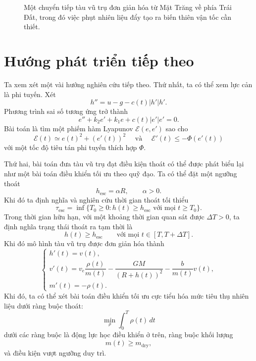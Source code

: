 ﻿\documentclass[12pt]{article}
\begin{document}
\begin{figure}[h]
\caption{Một chuyển tiếp tàu vũ trụ đơn giản hóa từ Mặt Trăng về phía Trái Đất, trong đó việc phụt nhiên liệu đẩy tạo ra biến thiên vận tốc cần thiết.}
\label{fig:moon-earth-transfer}
\end{figure} 

\section{Hướng phát triển tiếp theo}
Ta xem xét một vài hướng nghiên cứu tiếp theo.
Thứ nhất, ta có thể xem lực cản là phi tuyến. Xét
\[
 h'' = u - g - c(t)|h'|h'.
\]
Phương trình sai số tương ứng trở thành
\[
 e'' + k_2e' + k_1e + c(t)|e'|e' = 0.
\]
Bài toán là tìm một phiếm hàm Lyapunov $\mathcal E(e, e')$ sao cho
\[
 \mathcal E(t)\simeq e(t)^2 + (e'(t))^2 \quad \text{ và }\quad
 \mathcal E'(t) \leq - \Phi(e'(t))
\]
với một tốc độ tiêu tán phi tuyến thích hợp $\Phi$.

Thứ hai, bài toán đưa tàu vũ trụ đạt điều kiện thoát có thể được phát biểu lại như một bài toán điều khiển tối ưu theo quỹ đạo. Ta có thể đặt một ngưỡng thoát
\[
 h_{\mathrm{esc}} = \alpha R,\qquad \alpha > 0.
\]
Khi đó ta định nghĩa và nghiên cứu thời gian thoát tối thiểu
\[
 \tau_{\mathrm{esc}}
 = \inf\{T_0 \geq 0: h(t) \geq h_{\mathrm{esc}}
 \text{ với mọi }t \geq T_0\}.
\]
Trong thời gian hữu hạn, với một khoảng thời gian quan sát được $\Delta T>0$, ta định nghĩa trạng thái thoát ra tạm thời là
\[
 h(t) \geq h_{\mathrm{esc}}
 \qquad
 \text{với mọi }t \in [T, T + \Delta T].
\]
Khi đó mô hình tàu vũ trụ được đơn giản hóa thành
\[
\begin{cases}
 h'(t) = v(t),\\[0.3em]
 v'(t)
 =
 v_e\dfrac{\rho(t)}{m(t)}
 -
 \dfrac{GM}{(R + h(t))^2}
 -
 \dfrac{b}{m(t)}v(t),\\[0.8em]
 m'(t) = -\rho(t).
\end{cases}
\]
Khi đó, ta có thể xét bài toán điều khiển tối ưu cực tiểu hóa mức tiêu thụ nhiên liệu dưới ràng buộc thoát:
\[
 \min_{\rho} \int_0^T \rho(t)\, dt
\]
dưới các ràng buộc là động lực học điều khiển ở trên, ràng buộc khối lượng
\[
 m(t) \geq m_{\mathrm{dry}},
\]
và điều kiện vượt ngưỡng duy trì.
\end{document}
